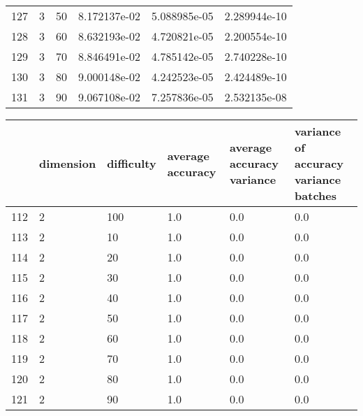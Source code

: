 \documentclass{article}
\begin{document}
\begin{center}
\begin{tabular}{llllll}
127 &         3 &         50 &  8.172137e-02 &          5.088985e-05 &                      2.289944e-10 \\
128 &         3 &         60 &  8.632193e-02 &          4.720821e-05 &                      2.200554e-10 \\
129 &         3 &         70 &  8.846491e-02 &          4.785142e-05 &                      2.740228e-10 \\
130 &         3 &         80 &  9.000148e-02 &          4.242523e-05 &                      2.424489e-10 \\
131 &         3 &         90 &  9.067108e-02 &          7.257836e-05 &                      2.532135e-08 \\
\bottomrule
\end{tabular}
\end{center}
\begin{center}
\begin{tabular}{llllll}
\toprule
{} & dimension & difficulty & average accuracy & average accuracy variance & variance of accuracy variance batches \\
\midrule
112 &         2 &        100 &              1.0 &                       0.0 &                                   0.0 \\
113 &         2 &         10 &              1.0 &                       0.0 &                                   0.0 \\
114 &         2 &         20 &              1.0 &                       0.0 &                                   0.0 \\
115 &         2 &         30 &              1.0 &                       0.0 &                                   0.0 \\
116 &         2 &         40 &              1.0 &                       0.0 &                                   0.0 \\
117 &         2 &         50 &              1.0 &                       0.0 &                                   0.0 \\
118 &         2 &         60 &              1.0 &                       0.0 &                                   0.0 \\
119 &         2 &         70 &              1.0 &                       0.0 &                                   0.0 \\
120 &         2 &         80 &              1.0 &                       0.0 &                                   0.0 \\
121 &         2 &         90 &              1.0 &                       0.0 &                                   0.0 \\

\end{tabular}
\end{center}
\end{document}
